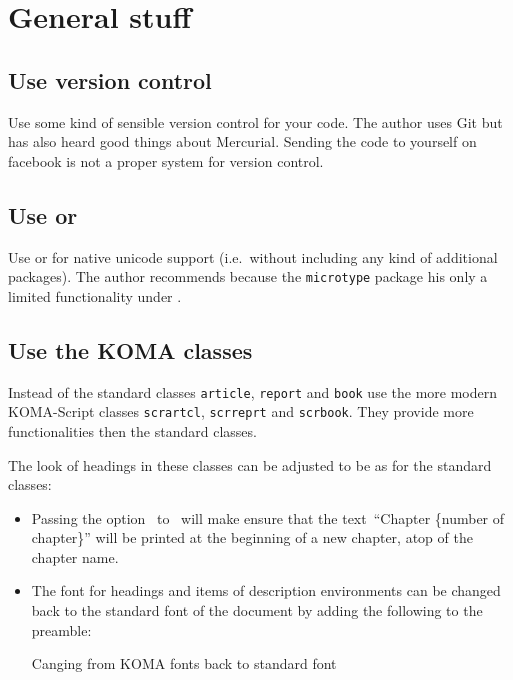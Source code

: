 \chapter{General stuff}





\section{Use version control}

Use some kind of sensible version control for your code.
The author uses Git but has also heard good things about Mercurial.
Sending the code to yourself on facebook is not a proper system for version control.





\section{Use  or }

Use {\LuaLaTeX} or {\XeLaTeX} for native unicode support (i.e.\ without including any kind of additional packages).
The author recommends {\LuaLaTeX} because the \texttt{microtype} package his only a limited functionality under {\XeLaTeX}.





\section{Use the KOMA classes}

Instead of the standard classes \texttt{article}, \texttt{report} and \texttt{book} use the more modern KOMA-Script classes \texttt{scrartcl}, \texttt{scrreprt} and \texttt{scrbook}.
They provide more functionalities then the standard classes.

The look of headings in these classes can be adjusted to be as for the standard classes:
\begin{itemize}
  \item
    Passing the option~ to~ will make ensure that the text~\enquote{Chapter \{number of chapter\}} will be printed at the beginning of a new chapter, atop of the chapter name.
  \item
    The font for headings and items of description environments can be changed back to the standard font of the document by adding the following to the preamble:
    \begin{showcode}{Canging from KOMA fonts back to standard font}
    \end{showcode}
\end{itemize}





